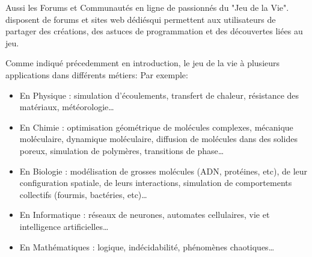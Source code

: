 Aussi les Forums et Communautés en ligne de passionnés du "Jeu de la Vie". disposent de forums et sites web dédiésqui permettent aux utilisateurs de partager des créations, des astuces de programmation et des découvertes liées au jeu.

Comme indiqué précedemment en introduction, le jeu de la vie à plusieurs applications dans différents métiers:
Par exemple: 
\begin{itemize}
    \item En Physique : simulation d’écoulements, transfert de chaleur, résistance des matériaux, météorologie…
    \item En Chimie : optimisation géométrique de molécules complexes, mécanique moléculaire, dynamique moléculaire, diffusion de molécules dans des solides poreux, simulation de polymères, transitions de phase…
    \item En Biologie : modélisation de grosses molécules (ADN, protéines, etc), de leur configuration spatiale, de leurs interactions, simulation de comportements collectifs (fourmis, bactéries, etc)…
    \item En Informatique : réseaux de neurones, automates cellulaires, vie et intelligence artificielles…
    \item En Mathématiques : logique, indécidabilité, phénomènes chaotiques…
\end{itemize}







